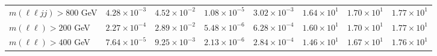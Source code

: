 \begin{table}[htp]
{\begin{tabular}{l | c c c c | c c c}
      $m(\ell\ell jj) > 800$ GeV & $4.28 \times 10^{-3}$ & $4.52 \times 10^{-2}$ & $1.08 \times 10^{-5}$ & $3.02 \times 10^{-3}$ & $1.64 \times 10^{1}$ & $1.70 \times 10^{1}$ & $1.77 \times 10^{1}$ \\
      $m(\ell\ell) > 200$ GeV & $2.27 \times 10^{-4}$ & $2.89 \times 10^{-2}$ & $5.48 \times 10^{-6}$ & $6.28 \times 10^{-4}$ & $1.60 \times 10^{1}$ & $1.70 \times 10^{1}$ & $1.77 \times 10^{1}$ \\
      $m(\ell\ell) > 400$ GeV & $7.64 \times 10^{-5}$ & $9.25 \times 10^{-3}$ & $2.13 \times 10^{-6}$ & $2.84 \times 10^{-4}$ & $1.46 \times 10^{1}$ & $1.67 \times 10^{1}$ & $1.76 \times 10^{1}$ \\
      \hline
    \end{tabular}
  }
\end{table}
